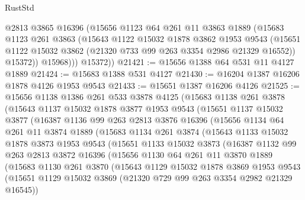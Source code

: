 \begin{lexlean}{RustStd}
\begin{coremodule}
            @2813
            @3865
            @16396
            (@15656
              @1123
              @64
              @261
              @11
              @3863
              @1889
              (@15683
                @1123
                @261
                @3863
                (@15643
                  @1122
                  @15032
                  @1878
                  @3862
                  @1953
                  @9543
                  (@15651 @1122 @15032 @3862 (@21320 @733 @99 @263 @3354 @2986 @21329 @16552))
                  @15372))
              @15968)))
        @15372))
@21421 := @15656 @1388 @64 @531 @11 @4127 @1889
@21424 := @15683 @1388 @531 @4127
@21430 := @16204 @1387 @16206 @1878 @4126 @1953 @9543
@21433 := @15651 @1387 @16206 @4126
@21525 := @15656
    @1138
    @1386
    @261
    @533
    @3878
    @4125
    (@15683
      @1138
      @261
      @3878
      (@15643
        @1137
        @15032
        @1878
        @3877
        @1953
        @9543
        (@15651
          @1137
          @15032
          @3877
          (@16387
            @1136
            @99
            @263
            @2813
            @3876
            @16396
            (@15656
              @1134
              @64
              @261
              @11
              @3874
              @1889
              (@15683
                @1134
                @261
                @3874
                (@15643
                  @1133
                  @15032
                  @1878
                  @3873
                  @1953
                  @9543
                  (@15651
                    @1133
                    @15032
                    @3873
                    (@16387
                      @1132
                      @99
                      @263
                      @2813
                      @3872
                      @16396
                      (@15656
                        @1130
                        @64
                        @261
                        @11
                        @3870
                        @1889
                        (@15683
                          @1130
                          @261
                          @3870
                          (@15643
                            @1129
                            @15032
                            @1878
                            @3869
                            @1953
                            @9543
                            (@15651
                              @1129
                              @15032
                              @3869
                              (@21320 @729 @99 @263 @3354 @2982 @21329 @16545))

\end{coremodule}
\end{lexlean}
